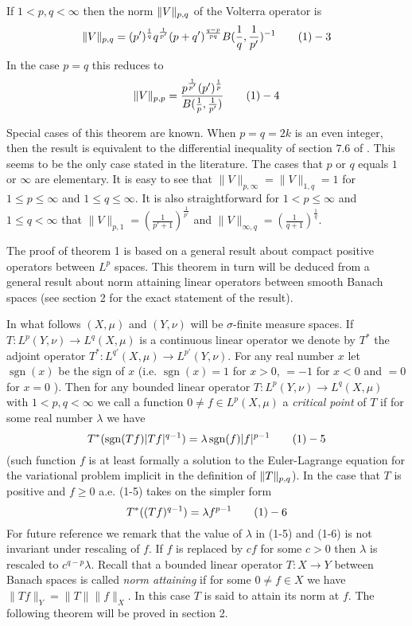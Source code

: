 If $1<p,q<\infty$ then the norm $\| V\| _{p,q}$ of the Volterra operator \V is
$$\nvpq = (p')^{\frac 1q} q^{\frac 1{p'}} (p+q')^{\frac {q-p}{pq} } B(\frac
1q, \frac 1{p'})^{-1} \tag 1-3$$ In the case $p=q$ this
reduces to $$\nvp =\frac {p^ \frac 1{p'}(p')^\frac 1p}{B(\frac 1p ,\frac
1{p'})}\tag 1-4$$
\endproclaim
 
Special cases of this theorem are known. When $p=q=2k$ is an even integer, then
the result is equivalent to the differential inequality of section $7.6$ of
\cite {H-L-P}. This seems to be the only case stated in the literature.
The cases that $p$ or $q$ equals $1$ or  $\infty$ are elementary. It is easy to
see that $\|V\|_{p,\infty } =\| V\|_{1,q} =1$ for $1\le p\le \infty$ and $1\le
q\le \infty $. It is also straightforward for $1<p\le \infty$ and $1\le q <
\infty$ that $\|V\|_{p,1}=(\frac 1{p'+1})^{\frac 1{p'}} $ and $\| V\|_{\infty
,q}= (\frac 1{q+1})^\frac 1q$. 

The proof of theorem 1  is based on a general result about compact positive
operators between $L^p$ spaces. This theorem in turn will be deduced from a
general result about norm attaining linear operators between smooth Banach
spaces (see section 2 for the exact statement of the result).

In what follows $(X,\mu )$ and $(Y,\nu )$ will be $\sigma$-finite measure
spaces. If $T: L^{p}(Y,\nu ) \to L^{q}(X,\mu )$ is a continuous linear
operator we denote by $T^*$ the adjoint operator $T^*: L^{q'}(X,\mu ) \to
L^{p'}(Y,\nu )$. For any real number $x$ let $\operatorname{sgn} (x)$ be the
sign of $x$ (i.e. $\operatorname{sgn} (x)=1 $ for $x>0$, $=-1$ for $x<0$ and
$=0$
for $x=0$ ). Then for any bounded linear operator $T: L^{p}(Y,\nu ) \to
L^{q}(X,\mu )$ with $1<p,q<\infty$ we call a function $0\neq f \in L^p(X,\mu)$
a {\it critical point\/} of $T$ if for some real number $\lambda$ we have
$$T^*(\operatorname{sgn} (Tf) |Tf|^{q-1}) =\lambda \operatorname{sgn}
(f)|f|^{p-1} \tag1-5$$ (such  function $f$ is at least formally a solution to
the Euler-Lagrange equation for the variational problem implicit in the
definition of $\| T\| _{p,q}$). In the case that $T$ is positive and $f\ge 0$ a.e.
(1-5) takes on the simpler form 
$$T^*((Tf)^{q-1})=\lambda f^{p-1}\tag 1-6$$
For future reference we remark that the value of $\lambda$ in (1-5) and (1-6)
is not invariant under rescaling of $f$. If $f$ is replaced by $cf$ for some
$c>0$ then $\lambda$ is rescaled to $c^{q-p}\lambda$. Recall that a bounded
linear operator $T:X\to Y$ between Banach spaces is called {\it norm
attaining\/} if for some $0\neq f \in X$ we have $\| Tf\|_Y= \|T\| \| f\|_X$.
In this case $T$ is said to attain its norm at $f$. The following theorem will
be proved in section 2.

